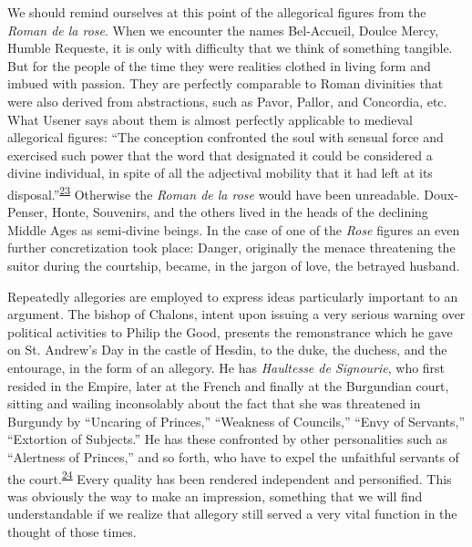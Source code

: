 \protect\hypertarget{16_Chapter_Nine__THE_DECLINE_OF_SYM.xhtmlux5cux23page_244}{}{}We
should remind ourselves at this point of the allegorical figures from
the \emph{Roman de la rose}. When we encounter the names Bel-Accueil,
Doulce Mercy, Humble Requeste, it is only with difficulty that we think
of something tangible. But for the people of the time they were
realities clothed in living form and imbued with passion. They are
perfectly comparable to Roman divinities that were also derived from
abstractions, such as Pavor, Pallor, and Concordia, etc. What Usener
says about them is almost perfectly applicable to medieval allegorical
figures: ``The conception confronted the soul with sensual force and
exercised such power that the word that designated it could be
considered a divine individual, in spite of all the adjectival mobility
that it had left at its
disposal.''\textsuperscript{\protect\hypertarget{16_Chapter_Nine__THE_DECLINE_OF_SYM.xhtmlux5cux23id_748}{\protect\hyperlink{23_NOTES.xhtmlux5cux23id_749}{23}}}
Otherwise the \emph{Roman de la rose} would have been unreadable.
Doux-Penser, Honte, Souvenirs, and the others lived in the heads of the
declining Middle Ages as semi-divine beings. In the case of one of the
\emph{Rose} figures an even further concretization took place: Danger,
originally the menace threatening the suitor during the courtship,
became, in the jargon of love, the betrayed husband.

Repeatedly allegories are employed to express ideas particularly
important to an argument. The bishop of Chalons, intent upon issuing a
very serious warning over political activities to Philip the Good,
presents the remonstrance which he gave on St. Andrew's Day in the
castle of Hesdin, to the duke, the duchess, and the entourage, in the
form of an allegory. He has \emph{Haultesse de Signourie}, who first
resided in the Empire, later at the French and finally at the Burgundian
court, sitting and wailing inconsolably about the fact that she was
threatened in Burgundy by ``Uncaring of Princes,'' ``Weakness of
Councils,'' ``Envy of Servants,'' ``Extortion of Subjects.'' He has
these confronted by other personalities such as ``Alertness of
Princes,'' and so forth, who have to expel the unfaithful servants of
the
court.\textsuperscript{\protect\hypertarget{16_Chapter_Nine__THE_DECLINE_OF_SYM.xhtmlux5cux23id_746}{\protect\hyperlink{23_NOTES.xhtmlux5cux23id_747}{24}}}
Every quality has been rendered independent and personified. This was
obviously the way to make an impression, something that we will find
understandable if we realize that allegory still served a very vital
function in the thought of those times.


